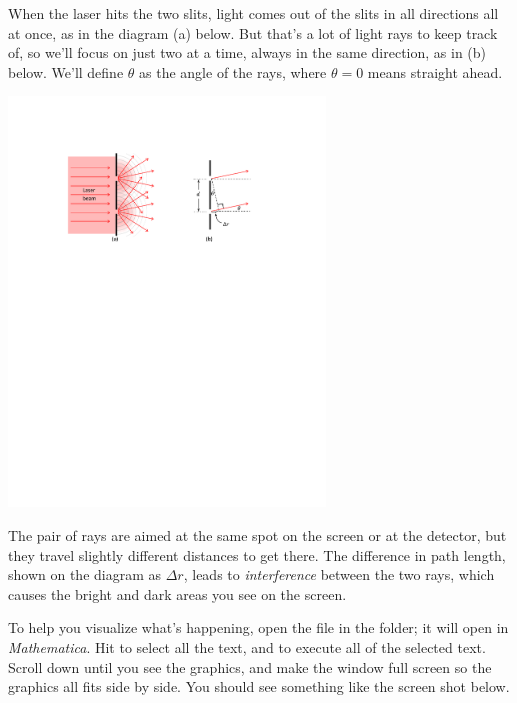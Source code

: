 When the laser hits the two slits, 
light comes out of the slits in all directions all at once, as in the diagram (a) below.  
But that's a lot of light rays to keep track of, so we'll focus on just two at a time, always in the same direction, as in (b) below.
We'll define $\theta$ as the angle of the rays, where $\theta=0$ means straight ahead.  

{\centering \includegraphics[width=0.63\textwidth]{interference_of_light/rays2_color.pdf} \par}

The pair of rays are aimed at the same spot on the screen or at the detector, 
but they travel slightly different distances to get there.  
The difference in path length, shown on the diagram as $\Delta r$, leads to \textit{interference} between the two rays, which causes the 
bright and dark areas you see on the screen.

To help you visualize what's happening, open the file  in the \filename{\coursefolder} folder; 
it will open in \textit{Mathematica}.  Hit  to select all the text, and  
to execute all of the selected text.  Scroll down until you see the graphics, and make the window full screen so the graphics all fits side by side.  You should see something like the screen shot below.

